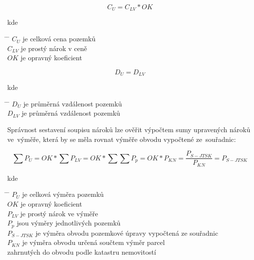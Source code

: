 \begin{equation}
	C_{U} = C_{LV}*OK
\end{equation}

kde
\begin{tabbing}
\hspace{2em} \= \hspace{5em} \= \kill
	\> $C_{U}$	\> je celková cena pozemků \\
	\> $C_{LV}$	\> je prostý nárok v ceně \\
	\> $OK$		\> je opravný koeficient
\end{tabbing}

\begin{equation}
	D_{U} = D_{LV}
\end{equation}

kde
\begin{tabbing}
\hspace{2em} \= \hspace{5em} \= \kill
	\> $D_{U}$	\> je průměrná vzdálenost pozemků \\
	\> $D_{LV}$	\> je průměrná vzdálenost pozemků
\end{tabbing}

Správnost sestavení soupisu nároků lze ověřit výpočtem sumy upravených nároků ve~výměře, která by se měla rovnat výměře obvodu  vypočtené ze~souřadnic:

\begin{equation}
	\sum\nolimits P_{U} = OK*\sum\nolimits P_{LV} = OK * \sum\nolimits \sum\nolimits P_{p} = OK*P_{KN} = \frac{P_{S-JTSK}}{P_{KN}} = P_{S-JTSK}
\end{equation}

kde
\begin{tabbing}
\hspace{2em} \= \hspace{5em} \= \kill
	\> $P_{U}$		\> je celková výměra pozemků \\
	\> $OK$			\> je opravný koeficient \\
	\> $P_{LV}$		\> je prostý nárok ve výměře \\
	\> $P_{p}$		\> jsou výměry jednotlivých pozemků \\
	\> $P_{S-JTSK}$	\> je výměra obvodu pozemkové úpravy vypočtená ze souřadnic \\
	\> $P_{KN}$		\> je výměra obvodu určená součtem výměr parcel \\
	\> 				\> zahrnutých do obvodu podle katastru nemovitostí	
\end{tabbing}

